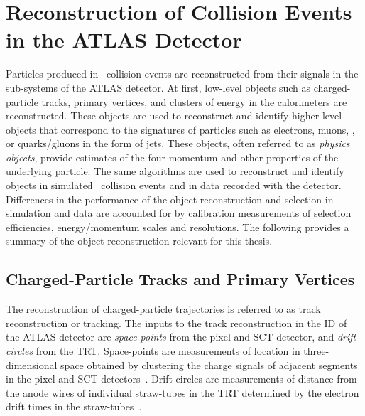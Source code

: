 \section{Reconstruction of Collision Events in the ATLAS Detector}%
\label{sec:object_reco_at_atlas}

Particles produced in \pp~collision events are reconstructed from their signals
in the sub-systems of the ATLAS detector. At first, low-level objects such as
charged-particle tracks, primary vertices, and clusters of energy in the
calorimeters are reconstructed. These objects are used to reconstruct and
identify higher-level objects that correspond to the signatures of particles
such as electrons, muons, \tauleptons, or quarks/gluons in the form of jets.
These objects, often referred to as \emph{physics objects}, provide estimates of
the four-momentum and other properties of the underlying particle. The same
algorithms are used to reconstruct and identify objects in simulated
\pp~collision events and in data recorded with the detector. Differences in the
performance of the object reconstruction and selection in simulation and data
are accounted for by calibration measurements of selection efficiencies,
energy/momentum scales and resolutions. The following provides a summary of the
object reconstruction relevant for this thesis.


\subsection{Charged-Particle Tracks and Primary Vertices}%
\label{sec:tracking_and_vertexing}


The reconstruction of charged-particle trajectories is referred to as track
reconstruction or tracking. The inputs to the track reconstruction in the ID of
the ATLAS detector are \emph{space-points} from the pixel and SCT detector, and
\emph{drift-circles} from the TRT. Space-points are measurements of location in
three-dimensional space obtained by clustering the charge signals of adjacent
segments in the pixel and SCT detectors~\cite{PERF-2015-08}. Drift-circles are
measurements of distance from the anode wires of individual straw-tubes in the
TRT determined by the electron drift times in the
straw-tubes~\cite{IDET-2015-01}.

